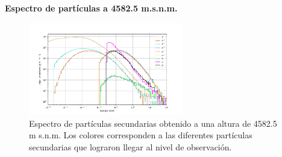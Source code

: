     \begin{frame}{} %
        \justifying %
        \vspace*{-0.2cm} %

        \begin{tcolorbox}[colback=custombgcolor2, coltext=customfgcolor2,
                      colframe=custombgcolor2, %
                      width=\textwidth,       %
                      boxrule=1pt,            %
                      top=1mm, bottom=1mm,     %
                      sharp corners=all,     %
                      halign=center,         %
                      valign=center,         %
                      ]
            \textbf{Espectro de partículas a 4582.5 m.s.n.m.}        
        \end{tcolorbox}
        
        \begin{figure}
            \centering
            \includegraphics[width=0.6\textwidth]{Figures/Thesis_flux_new2_4600msnm_without_title.png}
            \caption{\tiny Espectro de partículas secundarias obtenido a una altura de 4582.5 m s.n.m. Los colores corresponden a las diferentes partículas secundarias que lograron llegar al nivel de observación.}
        \end{figure}
    \end{frame} 

